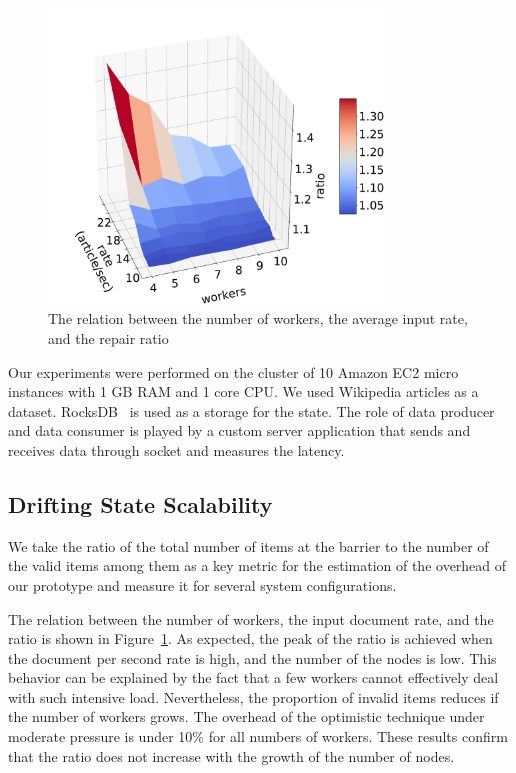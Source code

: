 \begin{figure}[t]
  \centering
  \includegraphics[width=0.80\textwidth]{Chapters/DeterministicModelRuntime/pics/overhead}
  \caption{The relation between the number of workers, the average input rate, and the repair ratio}
  \label {overhead}
\end{figure}

Our experiments were performed on the cluster of 10 Amazon EC2 micro instances with 1 GB RAM and 1 core CPU. We used Wikipedia articles as a dataset. RocksDB~\cite{rocksdb} is used as a storage for the state. The role of data producer and data consumer is played by a custom server application that sends and receives data through socket and measures the latency.

\subsection{Drifting State Scalability}

We take the ratio of  the total number of items at the barrier   to the number of the valid items among them as a key metric for the estimation of the overhead of our prototype and measure it for several system configurations.

The relation between the number of workers, the input  document  rate, and the  ratio is shown in Figure~\ref{overhead}. As expected, the peak of the ratio is achieved when the document per second rate is high, and the number of the nodes is low. This behavior can be explained by the fact that a few workers cannot effectively deal with such intensive load. Nevertheless, the proportion of invalid items reduces if the number of workers grows. The overhead of the optimistic technique under moderate pressure  is under 10\% for all  numbers of workers. These results confirm that the ratio does not increase with the growth of the number of nodes.

